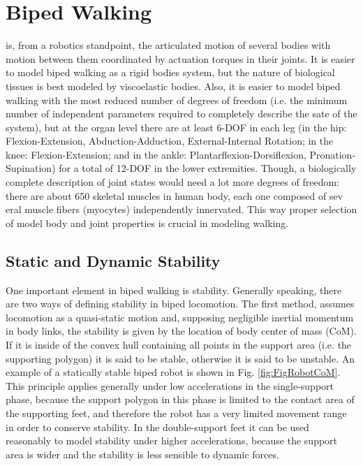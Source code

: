 \section{Biped Walking}
 is, from a robotics standpoint, the
articulated motion of several bodies with motion between them
coordinated by actuation torques in their joints. It is easier to
model biped walking as a rigid bodies system, but the nature of
biological tissues is best modeled by viscoelastic bodies. Also, it is
easier to model biped walking with the most reduced number of degrees
of freedom (i.e. the minimum number of independent parameters required
to completely describe the sate of the system), but at the organ level
there are at least 6-DOF in each leg (in the hip: Flexion-Extension,
Abduction-Adduction, External-Internal Rotation; in the knee:
Flexion-Extension; and in the ankle: Plantarflexion-Dorsiflexion,
Pronation-Supination) for a total of 12-DOF in the lower
extremities. Though, a biologically complete description of joint
states would need a lot more degrees of freedom: there are about 650
skeletal muscles in human body, each one composed of sev
eral muscle fibers (myocytes) independently innervated. This way
proper selection of model body and joint properties is crucial in
modeling walking.




\subsection{Static and Dynamic Stability}
One important element in biped walking is stability. Generally
speaking, there are two ways of defining stability in biped
locomotion. The first method, assumes locomotion as a quasi-static
motion and, supposing negligible inertial momentum in body links, the
stability is given by the location of body center of mass (CoM). If it
is inside of the convex hull containing all points in the support area
(i.e. the supporting polygon) it is said to be stable, otherwise it is
said to be unstable. An example of a statically stable biped robot is
shown in Fig. \ref{fig:FigRobotCoM}. This principle applies generally
under low accelerations in the single-support phase, because the
support polygon in this phase is limited to the contact area of the
supporting feet, and therefore the robot has a very limited movement
range in order to conserve stability. In the double-support feet it
can be used reasonably to model stability under higher accelerations,
because the support area is wider and the stability is less sensible
to dynamic forces.  


